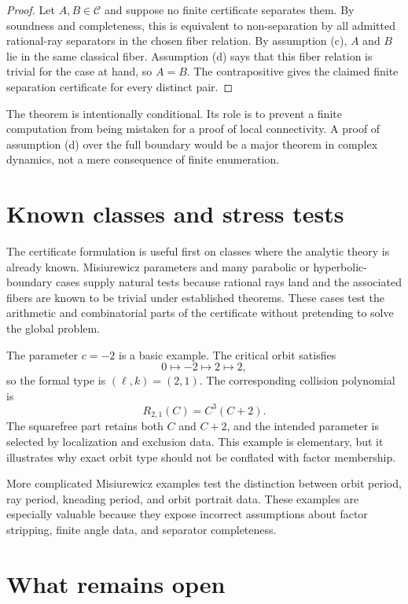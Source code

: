 \documentclass[11pt]{amsart}
\begin{document}
\begin{proof}
Let \(A,B\in\mathcal C\) and suppose no finite certificate separates them.  By soundness and completeness, this is equivalent to non-separation by all admitted rational-ray separators in the chosen fiber relation.  By assumption (c), \(A\) and \(B\) lie in the same classical fiber.  Assumption (d) says that this fiber relation is trivial for the case at hand, so \(A=B\).  The contrapositive gives the claimed finite separation certificate for every distinct pair.
\end{proof}

The theorem is intentionally conditional.  Its role is to prevent a finite computation from being mistaken for a proof of local connectivity.  A proof of assumption (d) over the full boundary would be a major theorem in complex dynamics, not a mere consequence of finite enumeration.

\section{Known classes and stress tests}

The certificate formulation is useful first on classes where the analytic theory is already known.  Misiurewicz parameters and many parabolic or hyperbolic-boundary cases supply natural tests because rational rays land and the associated fibers are known to be trivial under established theorems.  These cases test the arithmetic and combinatorial parts of the certificate without pretending to solve the global problem.

The parameter \(c=-2\) is a basic example.  The critical orbit satisfies
\[
        0\mapsto -2\mapsto 2\mapsto 2,
\]
so the formal type is \((\ell,k)=(2,1)\).  The corresponding collision polynomial is
\[
        R_{2,1}(C)=C^3(C+2).
\]
The squarefree part retains both \(C\) and \(C+2\), and the intended parameter is selected by localization and exclusion data.  This example is elementary, but it illustrates why exact orbit type should not be conflated with factor membership.

More complicated Misiurewicz examples test the distinction between orbit period, ray period, kneading period, and orbit portrait data.  These examples are especially valuable because they expose incorrect assumptions about factor stripping, finite angle data, and separator completeness.

\section{What remains open}
\end{document}
